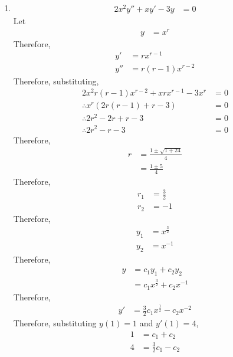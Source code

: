 \documentclass[fleqn, a4paper, 11pt, oneside]{amsart}
\theoremstyle{definition}
\theoremstyle{theorem}
\begin{document}
\begin{solution}
	\begin{enumerate}[leftmargin = *]
		\item
			\begin{align*}
				2 x^2 y'' + x y' - 3 y & = 0
			\end{align*}
			Let
			\begin{align*}
				y &= x^r
			\end{align*}
			Therefore,
			\begin{align*}
				y'  & = r x^{r - 1} \\
				y'' & = r (r - 1) x^{r - 2}
			\end{align*}
			Therefore, substituting,
			\begin{align*}
				2 x^2 r (r - 1) x^{r - 2} + x r x^{r - 1} - 3 x^r & = 0 \\
				\therefore x^r \left( 2 r (r - 1) + r - 3 \right) & = 0 \\
				\therefore 2 r^2 - 2 r + r - 3                    & = 0 \\
				\therefore 2 r^2 - r - 3                          & = 0
			\end{align*}
			Therefore,
			\begin{align*}
				r & = \frac{1 \pm \sqrt{1 + 24}}{4} \\
                                  & = \frac{1 \pm 5}{4}
			\end{align*}
			Therefore,
			\begin{align*}
				r_1 & = \frac{3}{2} \\
				r_2 & = -1
			\end{align*}
			Therefore,
			\begin{align*}
				y_1 & = x^{\frac{3}{2}} \\
				y_2 & = x^{-1}
			\end{align*}
			Therefore,
			\begin{align*}
				y & = c_1 y_1 + c_2 y_2 \\
                                  & = c_1 x^{\frac{3}{2}} + c_2 x^{-1}
			\end{align*}
			Therefore,
			\begin{align*}
				y' & = \frac{3}{2} c_1 x^{\frac{1}{2}} - c_2 x^{-2}
			\end{align*}
			Therefore, substituting $y(1) = 1$ and $y'(1) = 4$,
			\begin{align*}
				1 & = c_1 + c_2 \\
				4 & = \frac{3}{2} c_1 - c_2
			\end{align*}

\end{enumerate}
\end{solution}
\end{document}

